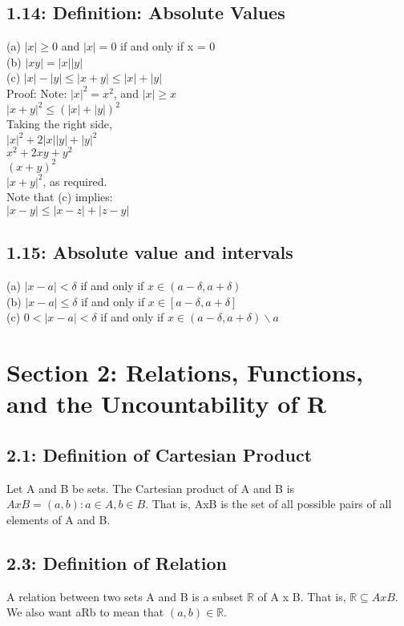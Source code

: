 \documentclass[10pt,letter]{report}
\begin{document}
\section*{1.14: Definition: Absolute Values}
(a) $|x| \geq 0$ and $|x| = 0$ if and only if x = 0\\
(b) $|xy| = |x||y|$\\
(c) $|x|-|y|\leq|x+y|\leq|x| + |y|$\\
Proof: Note: $|x|^2 = x^2$, and $|x| \geq x$\\
$|x+y|^2 \leq (|x| + |y|)^2$\\
Taking the right side, \\ 
$|x|^2 + 2|x||y| + |y|^2$\\ 
$x^2 + 2xy + y^2$\\
$(x+y)^2$\\ 
$|x+y|^2$, as required. \\ 

Note that (c) implies: \\ 
$|x - y| \leq |x - z| + |z - y|$\\ 

\section*{1.15: Absolute value and intervals}
(a) $|x - a| < \delta$ if and only if $x \in (a-\delta, a+\delta)$\\
(b) $|x - a| \leq \delta$ if and only if $x \in [a-\delta, a+\delta]$\\
(c) $0 < |x - a| < \delta$ if and only if $x \in (a-\delta, a+\delta) \backslash {a}$\\



\chapter*{Section 2: Relations, Functions, and the Uncountability of R}

\section*{2.1: Definition of Cartesian Product}
Let A and B be sets. The Cartesian product of A and B is $A x B = {(a,b): a \in A, b \in B}$. That is, AxB is the set of all possible pairs of all elements of A and B. 

\section*{2.3: Definition of Relation}
A relation between two sets A and B is a subset $\mathbb{R}$ of A x B. That is, $\mathbb{R} \subseteq A x B$. We also want aRb to mean that $(a,b) \in \mathbb{R}$.
\end{document}
